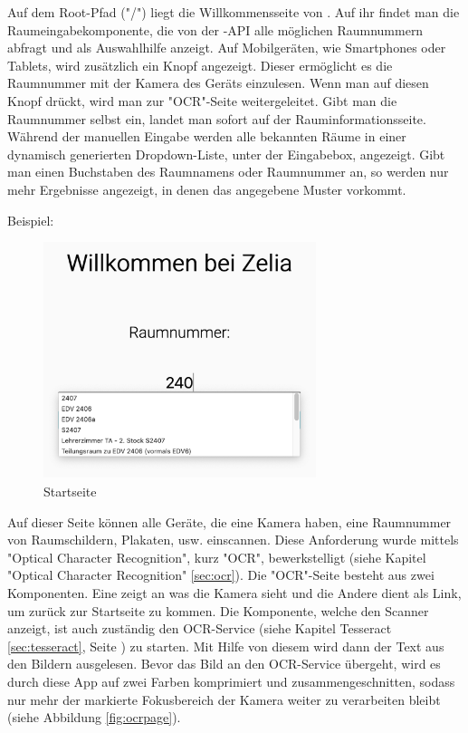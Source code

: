 \begin{minipage}{\textwidth}
    \label{sec:webcompstart}
    
    Auf dem Root-Pfad ("/") liegt die Willkommensseite von \ZELIA. Auf ihr findet man die Raumeingabekomponente, die von der \ZELIA-API alle möglichen Raumnummern abfragt und als Auswahlhilfe anzeigt. Auf Mobilgeräten, wie Smartphones oder Tablets, wird zusätzlich ein Knopf angezeigt. Dieser ermöglicht es die Raumnummer mit der Kamera des Geräts einzulesen. Wenn man auf diesen Knopf drückt, wird man zur "OCR"-Seite weitergeleitet. Gibt man die Raumnummer selbst ein, landet man sofort auf der Rauminformationsseite. Während der manuellen Eingabe werden alle bekannten Räume in einer dynamisch generierten Dropdown-Liste, unter der Eingabebox, angezeigt. Gibt man einen Buchstaben des Raumnamens oder Raumnummer an, so werden nur mehr Ergebnisse angezeigt, in denen das angegebene Muster vorkommt.
\end{minipage}

Beispiel:

\begin{figure}[H]
    \centering
    \includegraphics[width=80mm]{media/WebComponents/Startseite_light.png}
    \caption{Startseite}
    \label{fig:compinput}
\end{figure}



Auf dieser Seite können alle Geräte, die eine Kamera haben, eine Raumnummer von Raumschildern, Plakaten, usw. einscannen. Diese Anforderung wurde mittels "Optical Character Recognition", kurz "OCR", bewerkstelligt (siehe Kapitel "Optical Character Recognition" \ref{sec:ocr}). Die "OCR"-Seite besteht aus zwei Komponenten. Eine zeigt an was die Kamera sieht und die Andere dient als Link, um zurück zur Startseite zu kommen. Die Komponente, welche den Scanner anzeigt, ist auch zuständig den OCR-Service (siehe Kapitel Tesseract \ref{sec:tesseract}, Seite \pageref{sec:tesseract}) zu starten. Mit Hilfe von diesem wird dann der Text aus den Bildern ausgelesen. Bevor das Bild an den OCR-Service übergeht, wird es durch diese App auf zwei Farben komprimiert und zusammengeschnitten, sodass nur mehr der markierte Fokusbereich der Kamera weiter zu verarbeiten bleibt (siehe Abbildung \ref{fig:ocrpage}).

